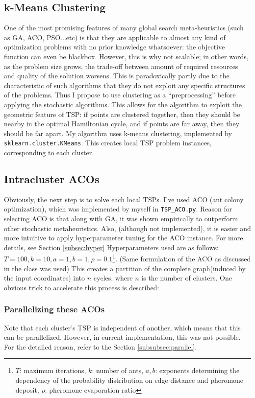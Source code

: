 \documentclass[a4paper]{article}
\begin{document}
\subsection{k-Means Clustering}
One of the most promising features of many global search meta-heuristics (such as GA, ACO, PSO...etc) is that they are applicable to almost any kind of optimization problems with no prior knowledge whatsoever: the objective function can even be blackbox.
However, this is why 
 not scalable; in other words, as the problem size grows, the trade-off between amount of required resources and quality of the solution worsens.
This is paradoxically partly due to the characteristic of such algorithms that they do not exploit any specific structures of the problems.
Thus I propose to use clustering as a \enquote{preprocessing} before applying the stochastic algorithms.
This allows for the algorithm to exploit the geometric feature of TSP: if points are clustered together, then they should be nearby in the optimal Hamiltonian cycle, and if points are far away, then they should be far apart.
My algorithm uses k-means clustering, implemented by \texttt{sklearn.cluster.KMeans}.
This creates local TSP problem instances, corresponding to each cluster.

\subsection{Intracluster ACOs}
Obviously, the next step is to solve each local TSPs.
I've used ACO (ant colony optimization), which was implemented by myself in \texttt{TSP\_ACO.py}.
Reason for selecting ACO is that along with GA, it was shown empirically to outperform other stochastic metaheuristics\cite{CT19}.
Also, (although not implemented), it is easier and more intuitive to apply hyperparameter tuning for the ACO instance. For more details, see Section \ref{subsec:hyper}
Hyperparameters used are as follows: $T = 100, k = 10, a = 1, b = 1, \rho = 0.1$\footnote{$T$: maximum iterations, $k$: number of ants, $a, b$: exponents determining the dependency of the probability distribution on edge distance and pheromone deposit, $\rho$: pheromone evaporation ratio}.
(Same formulation of the ACO as discussed in the class was used)
This creates a partition of the complete graph(induced by the input coordinates) into $n$ cycles, where $n$ is the number of clusters.
One obvious trick to accelerate this process is described:

\subsubsection{Parallelizing these ACOs}
Note that each cluster's TSP is independent of another, which means that this can be parallelized.
However, in current implementation, this was not possible.
For the detailed reason, refer to the Section \ref{subsubsec:parallel}.
\end{document}
